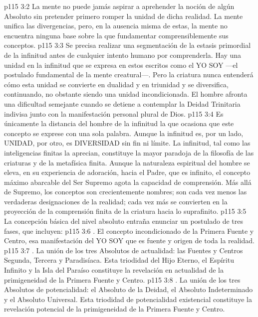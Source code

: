 \vs p115 3:2 La mente no puede jamás aspirar a aprehender la noción de algún Absoluto sin pretender primero romper la unidad de dicha realidad. La mente unifica las divergencias, pero, en la ausencia misma de estas, la mente no encuentra ninguna base sobre la que fundamentar comprensiblemente sus conceptos.
\vs p115 3:3 Se precisa realizar una segmentación de la estasis primordial de la infinitud antes de cualquier intento humano por comprenderla. Hay una unidad en la infinitud que se expresa en estos escritos como el YO SOY ---el postulado fundamental de la mente creatural---. Pero la criatura nunca entenderá cómo esta unidad se convierte en dualidad y en triunidad y se diversifica, continuando, no obstante siendo una unidad incondicionada. El hombre afronta una dificultad semejante cuando se detiene a contemplar la Deidad Trinitaria indivisa junto con la manifestación personal plural de Dios.
\vs p115 3:4 Es únicamente la distancia del hombre de la infinitud la que ocasiona que este concepto se exprese con una sola palabra. Aunque la infinitud es, por un lado, UNIDAD, por otro, es DIVERSIDAD sin fin ni límite. La infinitud, tal como las inteligencias finitas la aprecian, constituye la mayor paradoja de la filosofía de las criaturas y de la metafísica finita. Aunque la naturaleza espiritual del hombre se eleva, en su experiencia de adoración, hacia el Padre, que es infinito, el concepto máximo abarcable del Ser Supremo agota la capacidad de comprensión. Más allá de Supremo, los conceptos son crecientemente nombres; son cada vez menos las verdaderas designaciones de la realidad; cada vez más se convierten en la proyección de la comprensión finita de la criatura hacia lo suprafinito.
\vs p115 3:5 \pc La concepción básica del nivel absoluto entraña enunciar un postulado de tres fases, que incluyen:
\vs p115 3:6 . El concepto incondicionado de la Primera Fuente y Centro, esa manifestación del YO SOY que es fuente y origen de toda la realidad.
\vs p115 3:7 . La unión de los tres Absolutos de actualidad: las Fuentes y Centros Segunda, Tercera y Paradisíaca. Esta triodidad del Hijo Eterno, el Espíritu Infinito y la Isla del Paraíso constituye la revelación en actualidad de la primigeneidad de la Primera Fuente y Centro.
\vs p115 3:8 . La unión de los tres Absolutos de potencialidad: el Absoluto de la Deidad, el Absoluto Indeterminado y el Absoluto Universal. Esta triodidad de potencialidad existencial constituye la revelación potencial de la primigeneidad de la Primera Fuente y Centro.

